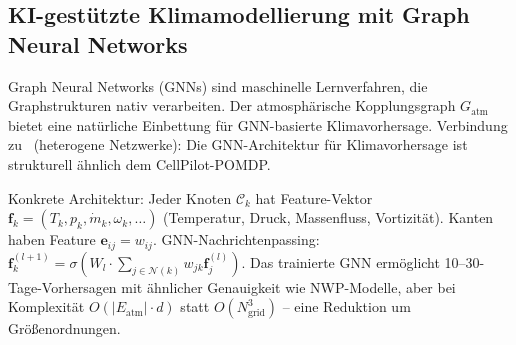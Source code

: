 ﻿\documentclass[a4paper,12pt]{article}
\theoremstyle{definition}
\begin{document}
\subsection{KI-gest\"utzte Klimamodellierung mit Graph Neural Networks}

Graph Neural Networks (GNNs) sind maschinelle Lernverfahren, die Graphstrukturen
nativ verarbeiten. Der atmosph\"arische Kopplungsgraph $G_{\mathrm{atm}}$ bietet
eine nat\"urliche Einbettung f\"ur GNN-basierte Klimavorhersage.
Verbindung zu~\cite{epp2026hetnet} (heterogene Netzwerke): Die GNN-Architektur
f\"ur Klimavorhersage ist strukturell \"ahnlich dem CellPilot-POMDP.

Konkrete Architektur: Jeder Knoten $\mathcal{C}_k$ hat Feature-Vektor
$\mathbf{f}_k = (T_k, p_k, \dot{m}_k, \omega_k, \ldots)$ (Temperatur, Druck,
Massenfluss, Vortizit\"at). Kanten haben Feature $\mathbf{e}_{ij} = w_{ij}$.
GNN-Nachrichtenpassing: $\mathbf{f}_k^{(l+1)} = \sigma(W_l \cdot \sum_{j \in \mathcal{N}(k)} w_{jk} \mathbf{f}_j^{(l)})$.
Das trainierte GNN erm\"oglicht 10--30-Tage-Vorhersagen mit \"ahnlicher Genauigkeit
wie NWP-Modelle, aber bei Komplexit\"at $O(|E_{\mathrm{atm}}| \cdot d)$ statt
$O(N_{\mathrm{grid}}^3)$ -- eine Reduktion um Gr\"o{\ss}enordnungen.
\end{document}
